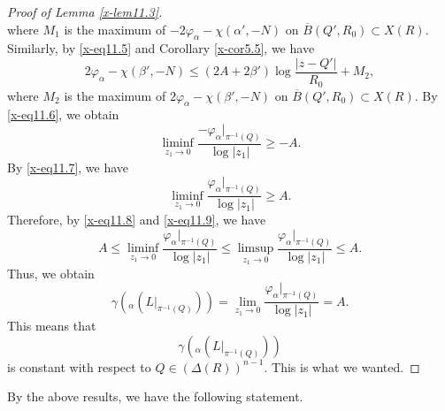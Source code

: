 \documentclass[12pt,twoside]{amsart}
\theoremstyle{definition}
\begin{document}
\begin{proof}[Proof of Lemma \ref{x-lem11.3}]
\begin{equation}
\end{equation} 
where $M_1$ is the maximum of $-2\varphi_\alpha -\chi (\alpha', -N)$ on $\overline 
B(Q', R_0)\subset X(R)$. 
Similarly, by \eqref{x-eq11.5} and Corollary \ref{x-cor5.5}, we have 
\begin{equation}\label{x-eq11.7}
2\varphi_\alpha -\chi (\beta', -N) \leq (2A+2\beta') \log \frac{|z-Q'|}{R_0} +M_2, 
\end{equation} 
where $M_2$ is the maximum of $2\varphi_\alpha -\chi (\beta', -N)$ on $\overline B(Q', R_0)
\subset X(R)$.
By \eqref{x-eq11.6}, we obtain 
\begin{equation}\label{x-eq11.8} 
\liminf _{z_1\to 0} \frac{-\varphi_\alpha|_{\pi^{-1}(Q)}}{\log |z_1|}\geq -A. 
\end{equation} 
By \eqref{x-eq11.7}, we have 
\begin{equation}\label{x-eq11.9} 
\liminf _{z_1\to 0} \frac{\varphi_\alpha|_{\pi^{-1}(Q)}}{\log |z_1|}\geq A. 
\end{equation} 
Therefore, by \eqref{x-eq11.8} and \eqref{x-eq11.9}, we have 
\begin{equation}\label{x-eq11.10}
A\leq \liminf_{z_1\to 0} \frac{\varphi_\alpha|_{\pi^{-1}(Q)}}{\log |z_1|}
\leq \limsup _{z_1\to 0} \frac{\varphi_\alpha|_{\pi^{-1}(Q)}}{\log |z_1|}
\leq A. 
\end{equation}
Thus, we obtain 
\begin{equation}\label{x-eq11.11} 
\gamma \left({}_\alpha (L|_{\pi^{-1}(Q)})\right) =\lim_{z_1\to 0} 
\frac{\varphi_\alpha|_{\pi^{-1}(Q)}}{\log |z_1|}=A. 
\end{equation} 
This means that 
\[
\gamma \left({}_\alpha (L|_{\pi^{-1}(Q)})\right)
\] 
is constant with respect to $Q\in \left(\Delta(R)\right)^{n-1}$. 
This is what we wanted. 
\end{proof}

By the above results, we have the following statement. 
\end{document}

